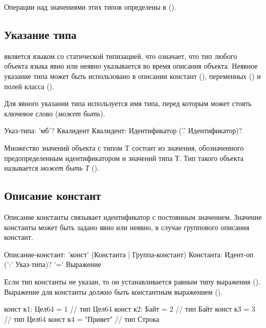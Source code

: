 \bigskip
Операции над значениями этих типов определены в ().

\hypertarget{type-ref}{%
\subsection{Указание типа}\label{decls:type-ref}}

\thelang{} является языком со статической типизацией, что означает, что тип любого объекта языка явно или неявно указывается во время описания объекта. 
Неявное указание типа может быть использовано в описании констант (), переменных () и полей класса ().

Для явного указании типа используется имя типа, перед которым может стоять ключевое слово  (\emph{может быть}). 

\begin{Grammar}
Указ-типа: 'мб'? Квалидент
Квалидент: Идентификатор ('.' Идентификатор)?
\end{Grammar} 

Множество значений объекта с типом  T состоит из значения, обозначенного предопределенным идентификатором   и значений типа Т. 
Тип такого объекта называется \emph{может быть Т} (). 


\hypertarget{constants}{%
\subsection{Описание констант}\label{decls:constants}}

Описание константы связывает идентификатор с постоянным значением. 
Значение константы может быть задано явно или неявно, в случае группового описания констант.

\begin{Grammar}
Описание-констант: 'конст' (Константа | Группа-констант)
Константа: Идент-оп (':' Указ-типа)? '=' Выражение
\end{Grammar} 

Если тип константы не указан, то он устанавливается равным типу выражения ().
Выражение для константы должно быть константным выражением ().

\begin{Trivil}
конст к1: Цел64 = 1 // тип Цел64
конст к2: Байт = 2 // тип Байт
конст к3 = 3 // тип Цел64
конст к4 = "Привет" // тип Строка
\end{Trivil}

